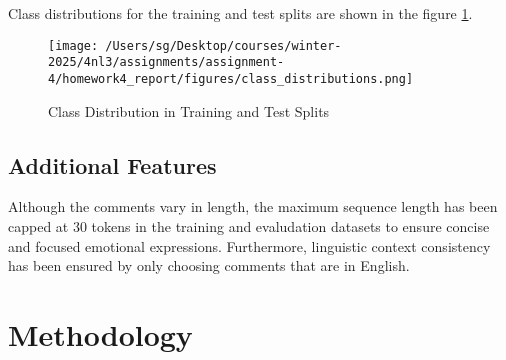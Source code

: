 \documentclass[titlepage]{article}
\begin{document}
Class distributions for the training and test splits are shown in the figure \ref{fig:class_distribution}.

\begin{figure}[H] \label{fig:class_distribution}
    \centering
    \texttt{[image: /Users/sg/Desktop/courses/winter-2025/4nl3/assignments/assignment-4/homework4\_report/figures/class\_distributions.png]}
    \caption{Class Distribution in Training and Test Splits}
\end{figure}

\subsection{Additional Features}
Although the comments vary in length, the maximum sequence length has been capped at 30 tokens in the training and evaludation datasets 
to ensure concise and focused emotional expressions. Furthermore, linguistic context consistency has been ensured by only choosing comments 
that are in English.
 








\section{Methodology}
\end{document}
